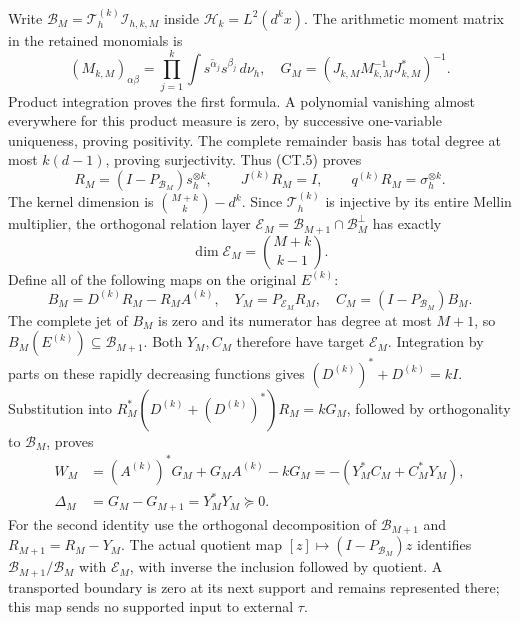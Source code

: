 Write \(\mathcal B_M=\mathcal T_h^{(k)}\mathcal I_{h,k,M}\)
inside \(\mathcal H_k=L^2(d^kx)\).  The arithmetic moment
matrix in the retained monomials is
\[
 (M_{k,M})_{\alpha\beta}=
   \prod_{j=1}^k\int\overline{s^{\alpha_j}}s^{\beta_j}
                   \,d\nu_h,\quad
 G_M=(J_{k,M}M_{k,M}^{-1}J_{k,M}^*)^{-1}.                 \tag{CT.12}
\]
Product integration proves the first formula.  A polynomial vanishing
almost everywhere for this product measure is zero, by successive
one-variable uniqueness, proving positivity.  The complete remainder
basis has total degree at most \(k(d-1)\), proving surjectivity.
Thus (CT.5) proves
\[
 R_M=(I-P_{\mathcal B_M})s_h^{\otimes k},\qquad
 J^{(k)}R_M=I,\qquad q^{(k)}R_M=\sigma_h^{\otimes k}.
 \tag{CT.13}
\]
The kernel dimension is \(\binom{M+k}{k}-d^k\).  Since
\(\mathcal T_h^{(k)}\) is injective by its entire Mellin
multiplier, the orthogonal relation layer
\(\mathcal E_M=\mathcal B_{M+1}\cap\mathcal B_M^\perp\)
has exactly
\[
 \dim\mathcal E_M=\binom{M+k}{k-1}.                      \tag{CT.14}
\]
Define all of the following maps on the original \(E^{(k)}\):
\[
 B_M=D^{(k)}R_M-R_MA^{(k)},\quad
 Y_M=P_{\mathcal E_M}R_M,\quad
 C_M=(I-P_{\mathcal B_M})B_M.                            \tag{CT.15}
\]
The complete jet of \(B_M\) is zero and its numerator has
degree at most \(M+1\), so
\(B_M(E^{(k)})\subseteq\mathcal B_{M+1}\).
Both \(Y_M,C_M\) therefore have target \(\mathcal E_M\).
Integration by parts on these rapidly decreasing functions gives
\((D^{(k)})^*+D^{(k)}=kI\).  Substitution into
\(R_M^*(D^{(k)}+(D^{(k)})^*)R_M=kG_M\), followed by
orthogonality to \(\mathcal B_M\), proves
\[
 \begin{split}
 W_M&=(A^{(k)})^*G_M+G_MA^{(k)}-kG_M
       =-(Y_M^*C_M+C_M^*Y_M),\\
 \Delta_M&=G_M-G_{M+1}=Y_M^*Y_M\succeq0.
 \end{split}                                                   \tag{CT.16}
\]
For the second identity use the orthogonal decomposition of
\(\mathcal B_{M+1}\) and \(R_{M+1}=R_M-Y_M\).
The actual quotient map
\([z]\mapsto(I-P_{\mathcal B_M})z\) identifies
\(\mathcal B_{M+1}/\mathcal B_M\) with \(\mathcal E_M\),
with inverse the inclusion followed by quotient.  A transported
boundary is zero at its next support and remains represented there;
this map sends no supported input to external \(\tau\).

